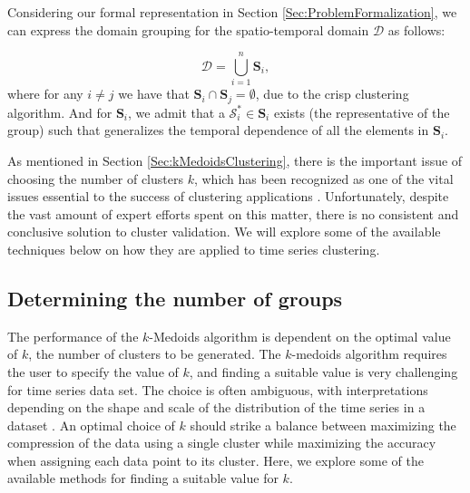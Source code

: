 Considering our formal representation in Section \ref{Sec:ProblemFormalization}, we can express the domain grouping for the spatio-temporal domain $\mathcal{D}$ as follows:

\begin{equation}
\mathcal{D} = \bigcup_{i=1}^{n} \mathbf{S}_{i},
\end{equation}
where for any $i\neq j$ we have that $\mathbf{S}_{i} \cap \mathbf{S}_{j} = \emptyset$, due to the crisp clustering algorithm. And for $\mathbf{S}_{i}$, we admit that a $\mathcal{S}_{i}^{*} \in \mathbf{S}_{i}$ exists (the representative of the group) such that generalizes the temporal dependence of all the elements in $\mathbf{S}_{i}$.

As mentioned in Section \ref{Sec:kMedoidsClustering}, there is the important issue of choosing the number of clusters $k$, which has been recognized as one of the vital issues essential to the success of clustering applications \cite{Aggarwal2013}. Unfortunately, despite the vast amount of expert efforts spent on this matter, there is no consistent and conclusive solution to cluster validation. We will explore some of the available techniques below on how they are applied to time series clustering.

\subsection{Determining the number of groups}
\label{Sec:domain_number_groups}

The performance of the $k$-Medoids algorithm is dependent on the optimal value of $k$, the number of clusters to be generated. The $k$-medoids algorithm requires the user to specify the value of $k$, and finding a suitable value is very challenging for time series data set. The choice is often ambiguous, with interpretations depending on the shape and scale of the distribution of the time series in a dataset \cite{Liao2005}. An optimal choice of $k$ should strike a balance between maximizing the compression of the data using a single cluster while maximizing the accuracy when assigning each data point to its cluster. Here, we explore some of the available methods for finding a suitable value for $k$.

